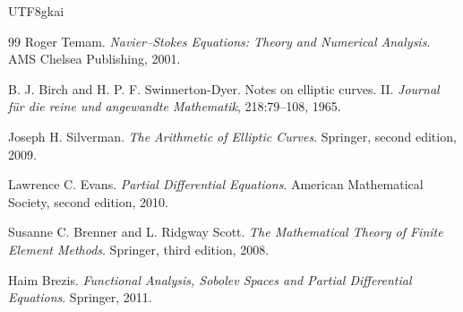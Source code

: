 \documentclass[12pt]{article}
\begin{document}
\begin{CJK*}{UTF8}{gkai}
\begin{thebibliography}{99}
Roger Temam.
\newblock \emph{Navier--Stokes Equations: Theory and Numerical Analysis}.
\newblock AMS Chelsea Publishing, 2001.

B. J. Birch and H. P. F. Swinnerton-Dyer.
\newblock Notes on elliptic curves. II.
\newblock \emph{Journal f\"ur die reine und angewandte Mathematik}, 218:79--108, 1965.

Joseph H. Silverman.
\newblock \emph{The Arithmetic of Elliptic Curves}.
\newblock Springer, second edition, 2009.

Lawrence C. Evans.
\newblock \emph{Partial Differential Equations}.
\newblock American Mathematical Society, second edition, 2010.

Susanne C. Brenner and L. Ridgway Scott.
\newblock \emph{The Mathematical Theory of Finite Element Methods}.
\newblock Springer, third edition, 2008.

Haim Brezis.
\newblock \emph{Functional Analysis, Sobolev Spaces and Partial Differential Equations}.
\newblock Springer, 2011.

\end{thebibliography}

\end{CJK*}
\end{document}
